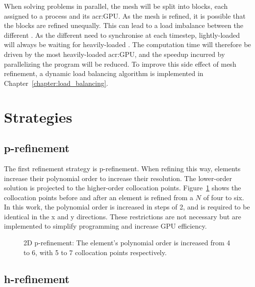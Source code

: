 When solving problems in parallel, the mesh will be split into blocks, each assigned to a process
and its \acrshort{acr:GPU}. As the mesh is refined, it is possible that the blocks are refined
unequally. This can lead to a load imbalance between the different . As the
different  need to synchronise at each timestep, lightly-loaded
 will always be waiting for heavily-loaded . The computation
time will therefore be driven by the most heavily-loaded \acrshort{acr:GPU}, and the speedup
incurred by parallelizing the program will be reduced. To improve this side effect of mesh
refinement, a dynamic load balancing algorithm is implemented in
Chapter~\ref{chapter:load_balancing}.

\section{Strategies}\label{section:adaptive_mesh_refinement:refinement_strategies}

\subsection{p-refinement}\label{subsection:adaptive_mesh_refinement:refinement_strategies:p-refinement}

The first refinement strategy is p-refinement. When refining this way, elements increase their
polynomial order to increase their resolution. The lower-order solution is projected to the
higher-order collocation points. Figure~\ref{fig:p-refinement} shows the collocation points before
and after an element is refined from a \(N\) of four to six. In this work, the polynomial order is
increased in steps of 2, and is required to be identical in the x and y directions. These
restrictions are not necessary but are implemented to simplify programming and increase GPU
efficiency.

\begin{figure}[H]
    \centering
    
    \caption{2D p-refinement: The element's polynomial order is increased from 4 to 6, with 5 to 7 collocation points respectively.}\label{fig:p-refinement}
\end{figure}

\subsection{h-refinement}\label{subsection:adaptive_mesh_refinement:refinement_strategies:h-refinement}

